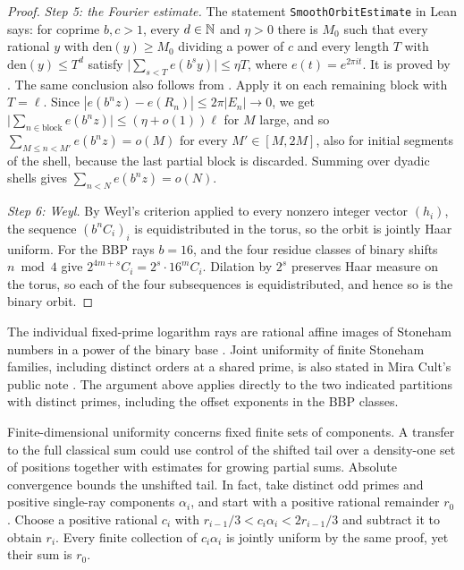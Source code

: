 \documentclass[11pt]{article}
\begin{document}
\begin{proof}
\emph{Step 5: the Fourier estimate.} The statement \texttt{SmoothOrbitEstimate} in Lean says: for coprime $b,c>1$, every $d\in\mathbb N$ and $\eta>0$ there is $M_0$ such that every rational $y$ with $\mathrm{den}(y)\ge M_0$ dividing a power of $c$ and every length $T$ with $\mathrm{den}(y)\le T^d$ satisfy $\bigl|\sum_{s<T}e(b^sy)\bigr|\le\eta T$, where $e(t)=e^{2\pi it}$. It is proved by . The same conclusion also follows from \cite[Corollary~1.2]{vandehey}. Apply it on each remaining block with $T=\ell$. Since $|e(b^nz)-e(R_n)|\le2\pi|E_n|\to0$, we get $\bigl|\sum_{n\in\text{block}}e(b^nz)\bigr|\le(\eta+o(1))\ell$ for $M$ large, and so $\sum_{M\le n<M'}e(b^nz)=o(M)$ for every $M'\in[M,2M]$, also for initial segments of the shell, because the last partial block is discarded. Summing over dyadic shells gives $\sum_{n<N}e(b^nz)=o(N)$.

\emph{Step 6: Weyl.} By Weyl's criterion applied to every nonzero integer vector $(h_i)$, the sequence $(b^nC_i)_i$ is equidistributed in the torus, so the orbit is jointly Haar uniform. For the BBP rays $b=16$, and the four residue classes of binary shifts $n\bmod4$ give $2^{4m+s}C_i=2^s\cdot16^mC_i$. Dilation by $2^s$ preserves Haar measure on the torus, so each of the four subsequences is equidistributed, and hence so is the binary orbit.
\end{proof}

The individual fixed-prime logarithm rays are rational affine images of Stoneham numbers in a power of the binary base \cite[Corollary~4.9(i), p.~536]{bc02}. Joint uniformity of finite Stoneham families, including distinct orders at a shared prime, is also stated in Mira Cult's public note \cite[Theorem~1]{mira}. The argument above applies directly to the two indicated partitions with distinct primes, including the offset exponents in the BBP classes.


Finite-dimensional uniformity concerns fixed finite sets of components. A transfer to the full classical sum could use control of the shifted tail over a density-one set of positions together with estimates for growing partial sums. Absolute convergence bounds the unshifted tail. In fact, take distinct odd primes and positive single-ray components $\alpha_i$, and start with a positive rational remainder $r_0$. Choose a positive rational $c_i$ with $r_{i-1}/3<c_i\alpha_i<2r_{i-1}/3$ and subtract it to obtain $r_i$. Every finite collection of $c_i\alpha_i$ is jointly uniform by the same proof, yet their sum is $r_0$.
\end{document}
